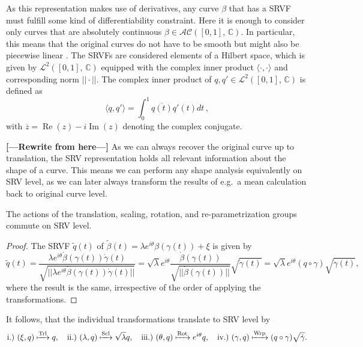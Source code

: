 \noindent As this representation makes use of derivatives, any curve $\beta$ that has a SRVF must fulfill some kind of differentiability constraint.
Here it is enough to consider only curves that are absolutely continuous $\beta \in \mathcal{AC}([0,1],\, \mathbb{C})$.
In particular, this means that the original curves do not have to be smooth but might also be piecewise linear \parencite[see][91]{SrivastavaKlassen2016}.
The SRVFs are considered elements of a Hilbert space, which is given by $\mathcal{L}^2([0,1],\,\mathbb{C})$ equipped with the complex inner product $\langle \cdot, \cdot \rangle$ and corresponding norm $||\cdot||$.
The complex inner product of $q,q' \in \mathcal{L}^2([0,1],\,\mathbb{C})$ is defined as
$$ \langle q, q' \rangle = \int_0^1 \overline{q(t)} q'(t) dt \,, $$
with $\overline{z} = \operatorname{Re}(z) - i \operatorname{Im}(z)$ denoting the complex conjugate.

\textbf{[---Rewrite from here---]}
As we can always recover the original curve up to translation, the SRV representation holds all relevant information about the shape of a curve.
This means we can perform any shape analysis equivalently on SRV level, as we can later always transform the results of e.g.\ a mean calculation back to original curve level.

\begin{lemma}
  The actions of the translation, scaling, rotation, and re-parametrization groups commute on SRV level.
\end{lemma}

\begin{proof} The SRVF $\tilde q(t)$ of  $\tilde\beta(t) = \lambda e^{i\theta}\beta\left(\gamma(t)\right) + \xi$ is given by
$$ \tilde q (t) 
  = \frac{\lambda e^{i\theta} \dot\beta\left(\gamma(t)\right) \dot\gamma(t)}{\sqrt{||\lambda e^{i\theta} \dot\beta\left(\gamma(t)\right) \dot\gamma(t)||}} 
  = \sqrt{\lambda} e^{i\theta} \frac{\dot\beta\left(\gamma(t)\right)}{\sqrt{||\dot\beta\left(\gamma(t)\right)||}} \sqrt{\dot\gamma(t)} 
  = \sqrt\lambda e^{i\theta} \left( q \circ \gamma \right) \sqrt{\dot\gamma(t)},$$
where the result is the same, irrespective of the order of applying the transformations.
\end{proof}

\begin{remark}
  It follows, that the individual transformations translate to SRV level by 
  $$\text{i.)} \,\,(\xi, q) \xmapsto{\text{Trl}} q,\quad 
    \text{ii.)} \,\, (\lambda, q) \xmapsto{\text{Scl}} \sqrt\lambda q,\quad
    \text{iii.)} \,\, (\theta, q) \xmapsto{\text{Rot}} e^{i\theta} q,\quad
    \text{iv.)} \,\, (\gamma, q) \xmapsto{\text{Wrp}} (q \circ \gamma) \sqrt{\dot\gamma}.$$
\end{remark}

